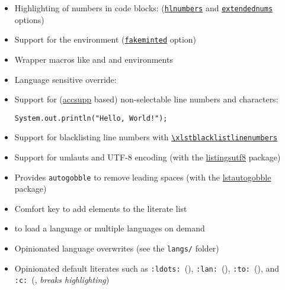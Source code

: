\documentclass[10pt,DIV=12]{scrartcl}
\let\T\texttt
\def\argref#1#2{\hyperref[arg:#1]{\T{#2}}}
\def\cmdref#1{\hyperref[arg:#1]{\T{\xlstGetStyle{command}\textbackslash #1}}}
\begin{document}
\begin{itemize}[nosep,itemsep=2pt,leftmargin=*]
    \item Highlighting of numbers in code blocks: \; (\argref{hlnumbers}{hlnumbers} and \argref{extendednums}{extendednums} options)
    \item Support for the  environment (\argref{fakeminted}{fakeminted} option)
    \item Wrapper macros like  and  and environments 
    \item Language sensitive override: 
    \item Support for (\href{https://ctan.org/pkg/accsupp}{accsupp} based) non-selectable line numbers and characters:
\begin{verbatim}
System.out.println("Hello, World!");
\end{verbatim}
    \item Support for blacklisting line numbers with \cmdref{xlstblacklistlinenumbers}
    \item Support for umlauts and UTF-8 encoding (with the \href{https://ctan.org/pkg/listingsutf8
    }{listingsutf8} package)
    \item Provides \texttt{autogobble} to remove leading spaces (with the \href{https://ctan.org/pkg/lstautogobble}{lstautogobble} package)
    \item Comfort key  to add elements to the literate list
    \item {} to load a language or multiple languages on demand
    \item Opinionated language overwrites (see the \T{langs/} folder)
    \item Opinionated default literates such as \T{:ldots:}~(), \T{:lan:}~(), \T{:to:}~(), and \T{:c:}~(, \textit{breaks highlighting})
\end{itemize}
\end{document}
